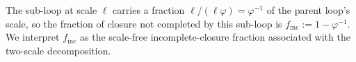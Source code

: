 \documentclass[entropy,article,submit,pdftex,moreauthors]{Definitions/mdpi}
\newtheorem{remarkX}[theoremX]{Remark}
\begin{document}


The sub-loop at scale \(\ell\) carries a fraction \(\ell/(\ell\varphi)=\varphi^{-1}\) of the parent loop's scale, so the fraction of closure not completed by this sub-loop is \(f_{\mathrm{inc}}:=1-\varphi^{-1}\). We interpret \(f_{\mathrm{inc}}\) as the scale-free incomplete-closure fraction associated with the two-scale decomposition.
\end{document}
